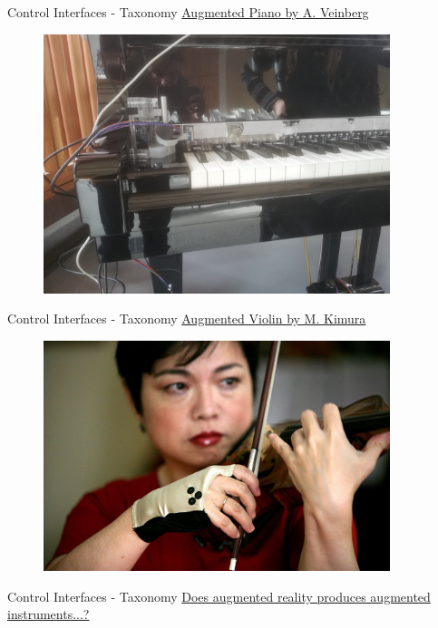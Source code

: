 \documentclass{beamer}
\begin{document}
\begin{frame}{Control Interfaces - Taxonomy}
    \href{https://www.youtube.com/watch?time_continue=153&v=6lfz51eDgfM}{Augmented Piano by A. Veinberg}
    \begin{figure}[h]
        \includegraphics[width=0.9\textwidth]{veinberg.jpg}
    \end{figure}
\end{frame}

\begin{frame}{Control Interfaces - Taxonomy}
    \href{https://www.youtube.com/watch?v=UKRrEdS_SMI}{Augmented Violin by M. Kimura}
    \begin{figure}[h]
        \includegraphics[width=0.9\textwidth]{kimura.jpg}
    \end{figure}
\end{frame}

\begin{frame}{Control Interfaces - Taxonomy}
    \href{https://www.youtube.com/watch?v=Pp-MwmSbOYo}{Does augmented reality produces augmented instruments...?}
\end{frame}
\end{document}
